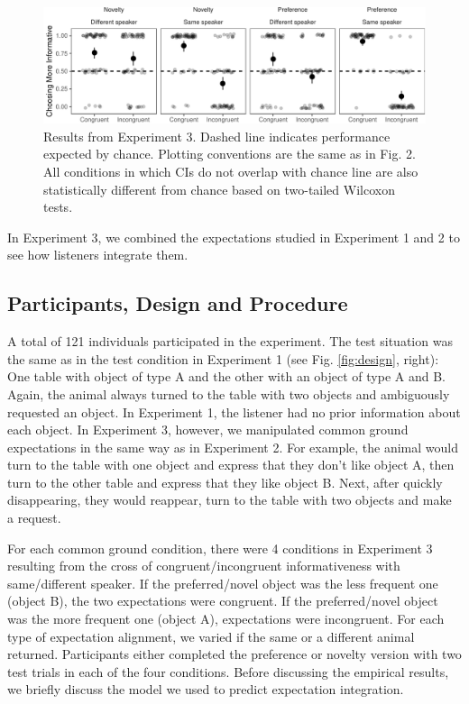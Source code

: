 \documentclass[10pt, letterpaper]{article}
\newenvironment{CodeChunk}{}{}
\begin{document}
\begin{CodeChunk}
\begin{figure}[h]

{\centering \includegraphics{figs/plotexp3-1} 

}

\caption[Results from Experiment 3]{Results from Experiment 3. Dashed line indicates performance expected by chance. Plotting conventions are the same as in Fig. 2. All conditions in which CIs do not overlap with chance line are also statistically different from chance based on two-tailed Wilcoxon tests.}\label{fig:plotexp3}
\end{figure}
\end{CodeChunk}

In Experiment 3, we combined the expectations studied in Experiment 1
and 2 to see how listeners integrate them.

\subsection{Participants, Design and
Procedure}\label{participants-design-and-procedure-2}

A total of 121 individuals participated in the experiment. The test
situation was the same as in the test condition in Experiment 1 (see
Fig. \ref{fig:design}, right): One table with object of type A and the
other with an object of type A and B. Again, the animal always turned to
the table with two objects and ambiguously requested an object. In
Experiment 1, the listener had no prior information about each object.
In Experiment 3, however, we manipulated common ground expectations in
the same way as in Experiment 2. For example, the animal would turn to
the table with one object and express that they don't like object A,
then turn to the other table and express that they like object B. Next,
after quickly disappearing, they would reappear, turn to the table with
two objects and make a request.

For each common ground condition, there were 4 conditions in Experiment
3 resulting from the cross of congruent/incongruent informativeness with
same/different speaker. If the preferred/novel object was the less
frequent one (object B), the two expectations were congruent. If the
preferred/novel object was the more frequent one (object A),
expectations were incongruent. For each type of expectation alignment,
we varied if the same or a different animal returned. Participants
either completed the preference or novelty version with two test trials
in each of the four conditions. Before discussing the empirical results,
we briefly discuss the model we used to predict expectation integration.
\end{document}

